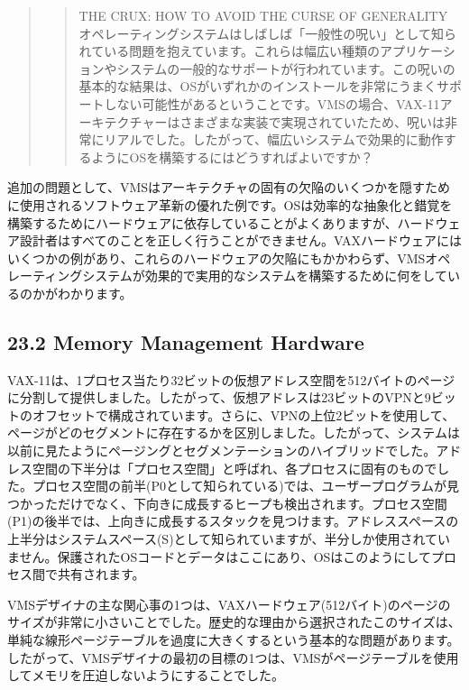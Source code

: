\begin{quote}
\begin{quote}
THE CRUX: HOW TO AVOID THE CURSE OF GENERALITY
オペレーティングシステムはしばしば「一般性の呪い」として知られている問題を抱えています。これらは幅広い種類のアプリケーションやシステムの一般的なサポートが行われています。この呪いの基本的な結果は、OSがいずれかのインストールを非常にうまくサポートしない可能性があるということです。VMSの場合、VAX-11アーキテクチャーはさまざまな実装で実現されていたため、呪いは非常にリアルでした。したがって、幅広いシステムで効果的に動作するようにOSを構築するにはどうすればよいですか？
\end{quote}
\end{quote}

追加の問題として、VMSはアーキテクチャの固有の欠陥のいくつかを隠すために使用されるソフトウェア革新の優れた例です。OSは効率的な抽象化と錯覚を構築するためにハードウェアに依存していることがよくありますが、ハードウェア設計者はすべてのことを正しく行うことができません。VAXハードウェアにはいくつかの例があり、これらのハードウェアの欠陥にもかかわらず、VMSオペレーティングシステムが効果的で実用的なシステムを構築するために何をしているのかがわかります。

\hypertarget{memory-management-hardware}{%
\subsection*{23.2 Memory Management
Hardware}\label{memory-management-hardware}}

VAX-11は、1プロセス当たり32ビットの仮想アドレス空間を512バイトのページに分割して提供しました。したがって、仮想アドレスは23ビットのVPNと9ビットのオフセットで構成されています。さらに、VPNの上位2ビットを使用して、ページがどのセグメントに存在するかを区別しました。したがって、システムは以前に見たようにページングとセグメンテーションのハイブリッドでした。アドレス空間の下半分は「プロセス空間」と呼ばれ、各プロセスに固有のものでした。プロセス空間の前半(P0として知られている)では、ユーザープログラムが見つかっただけでなく、下向きに成長するヒープも検出されます。プロセス空間(P1)の後半では、上向きに成長するスタックを見つけます。アドレススペースの上半分はシステムスペース(S)として知られていますが、半分しか使用されていません。保護されたOSコードとデータはここにあり、OSはこのようにしてプロセス間で共有されます。

VMSデザイナの主な関心事の1つは、VAXハードウェア(512バイト)のページのサイズが非常に小さいことでした。歴史的な理由から選択されたこのサイズは、単純な線形ページテーブルを過度に大きくするという基本的な問題があります。したがって、VMSデザイナの最初の目標の1つは、VMSがページテーブルを使用してメモリを圧迫しないようにすることでした。

